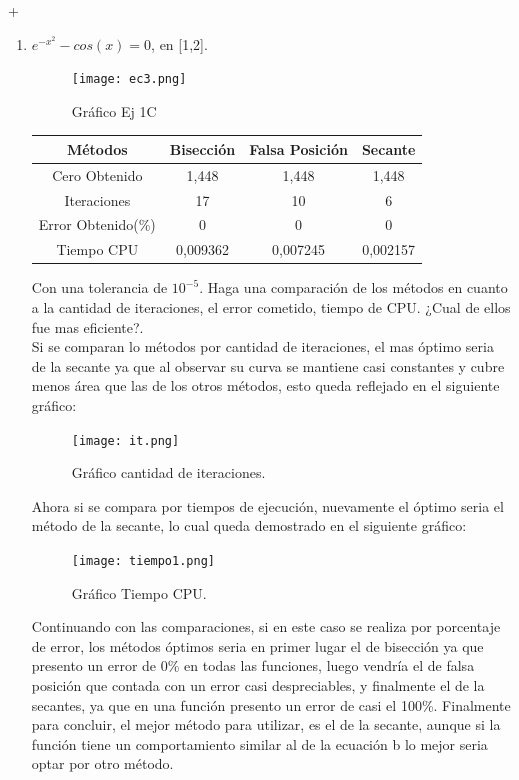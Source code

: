 +\documentclass{udpreport}
\begin{document}
\begin{enumerate}
\begin{enumerate}
    
    \item \(e^{-x^2} - cos(x) = 0 \), en [1,2].\\
        \begin{figure}[H]
            \centering
            \texttt{[image: ec3.png]}
            \caption{Gráfico Ej 1C}
        \end{figure}
            \begin{table}[H]
            \centering
           \begin{tabular} { |c|c|c|c|}
                \hline
                Métodos       & Bisección & Falsa Posición & Secante  \\
                \hline
                Cero Obtenido &  1,448      &    1,448     &      1,448   \\
                \hline
                Iteraciones   &    17       &    10    &      6        \\
                \hline
                Error Obtenido(\%) &       0      &       0      &     0         \\
                \hline
                Tiempo CPU &       0,009362     &      0,007245    &     0,002157         \\
                 \hline
                \end{tabular}
            \end{table}
      

    
  
    Con una tolerancia de $10^{−5}$. Haga una comparación de los métodos en cuanto a la cantidad de iteraciones, el error cometido, tiempo de CPU. ¿Cual de ellos fue mas eﬁciente?.\\
    Si se comparan lo métodos por cantidad de iteraciones, el mas óptimo seria de la secante ya que al observar su curva se mantiene casi constantes y cubre menos área que las de los otros métodos, esto queda reflejado en el siguiente gráfico:
    \begin{figure}[H]
        \centering
        \texttt{[image: it.png]}
        \caption{Gráfico cantidad de iteraciones.}
        \end{figure}
    Ahora si se compara por tiempos de ejecución, nuevamente el óptimo seria el método de la secante, lo cual queda demostrado en el siguiente gráfico:
    \begin{figure}[H]
        \centering
        \texttt{[image: tiempo1.png]}
        \caption{Gráfico Tiempo CPU.}
        \end{figure}
    Continuando con las comparaciones, si en este caso se realiza por porcentaje de error, los métodos óptimos seria en primer lugar el de bisección ya que presento un error de 0\% en todas las funciones, luego vendría el de falsa posición que contada con un error casi despreciables, y finalmente el de la secantes, ya que en una función presento un error de casi el 100\%.
    Finalmente para concluir, el mejor método para utilizar, es el de la secante, aunque si la función tiene un comportamiento similar al de la ecuación b lo mejor seria optar por otro método.
      

\end{enumerate}
\end{enumerate}
\end{document}
